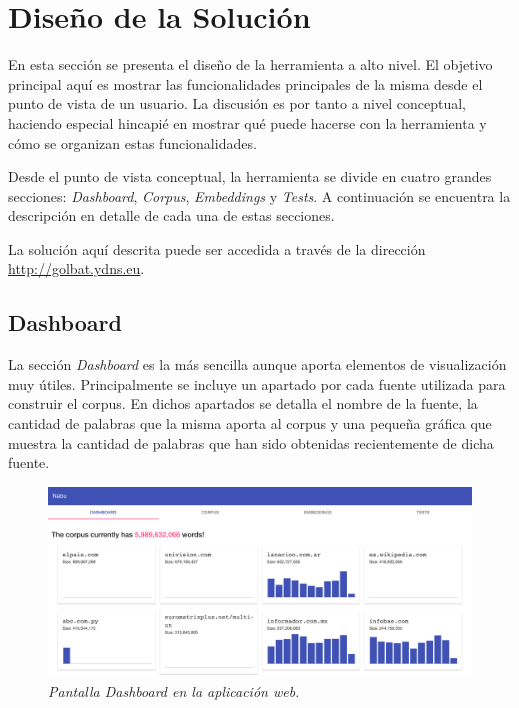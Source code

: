 \section{Diseño de la Solución}

En esta sección se presenta el diseño de la herramienta a alto nivel. El objetivo principal aquí es
mostrar las funcionalidades principales de la misma desde el punto de vista de un usuario. La discusión
es por tanto a nivel conceptual, haciendo especial hincapié en mostrar qué puede hacerse con la herramienta
y cómo se organizan estas funcionalidades.

Desde el punto de vista conceptual, la herramienta se divide en cuatro grandes secciones:
\textit{Dashboard}, \textit{Corpus}, \textit{Embeddings} y \textit{Tests}. A continuación se encuentra la
descripción en detalle de cada una de estas secciones.

La solución aquí descrita puede ser accedida a través de la dirección\\
\href{http://golbat.ydns.eu}{http://golbat.ydns.eu}.

\subsection{Dashboard}

La sección \textit{Dashboard} es la más sencilla aunque aporta elementos de visualización muy útiles.
Principalmente se incluye un apartado por cada fuente utilizada para construir el corpus. En dichos
apartados se detalla el nombre de la fuente, la cantidad de palabras que la misma aporta al corpus y una
pequeña gráfica que muestra la cantidad de palabras que han sido obtenidas recientemente de dicha fuente.

\begin{figure}[h]
    \centering
    \includegraphics[width=\textwidth]{images/ui-nabu-dashboard}
    \caption{\textit{Pantalla Dashboard en la aplicación web.}}
    \label{fig:ui-nabu-dashboard}
\end{figure}

